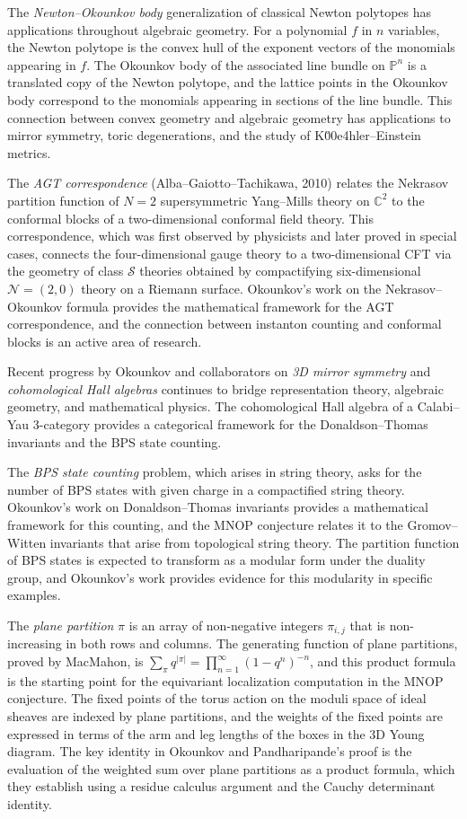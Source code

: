 The \emph{Newton--Okounkov body} generalization of classical Newton polytopes has applications throughout algebraic geometry. For a polynomial $f$ in $n$ variables, the Newton polytope is the convex hull of the exponent vectors of the monomials appearing in $f$. The Okounkov body of the associated line bundle on $\mathbb{P}^n$ is a translated copy of the Newton polytope, and the lattice points in the Okounkov body correspond to the monomials appearing in sections of the line bundle. This connection between convex geometry and algebraic geometry has applications to mirror symmetry, toric degenerations, and the study of K\u00e4hler--Einstein metrics.

The \emph{AGT correspondence} (Alba--Gaiotto--Tachikawa, 2010) relates the Nekrasov partition function of $N=2$ supersymmetric Yang--Mills theory on $\mathbb{C}^2$ to the conformal blocks of a two-dimensional conformal field theory. This correspondence, which was first observed by physicists and later proved in special cases, connects the four-dimensional gauge theory to a two-dimensional CFT via the geometry of class $\mathcal{S}$ theories obtained by compactifying six-dimensional $\mathcal{N}=(2,0)$ theory on a Riemann surface. Okounkov's work on the Nekrasov--Okounkov formula provides the mathematical framework for the AGT correspondence, and the connection between instanton counting and conformal blocks is an active area of research.

Recent progress by Okounkov and collaborators on \emph{3D mirror symmetry} and \emph{cohomological Hall algebras} continues to bridge representation theory, algebraic geometry, and mathematical physics. The cohomological Hall algebra of a Calabi--Yau 3-category provides a categorical framework for the Donaldson--Thomas invariants and the BPS state counting.

The \emph{BPS state counting} problem, which arises in string theory, asks for the number of BPS states with given charge in a compactified string theory. Okounkov's work on Donaldson--Thomas invariants provides a mathematical framework for this counting, and the MNOP conjecture relates it to the Gromov--Witten invariants that arise from topological string theory. The partition function of BPS states is expected to transform as a modular form under the duality group, and Okounkov's work provides evidence for this modularity in specific examples.

The \emph{plane partition} $\pi$ is an array of non-negative integers $\pi_{i,j}$ that is non-increasing in both rows and columns. The generating function of plane partitions, proved by MacMahon, is $\sum_\pi q^{|\pi|} = \prod_{n=1}^\infty (1-q^n)^{-n}$, and this product formula is the starting point for the equivariant localization computation in the MNOP conjecture. The fixed points of the torus action on the moduli space of ideal sheaves are indexed by plane partitions, and the weights of the fixed points are expressed in terms of the arm and leg lengths of the boxes in the 3D Young diagram. The key identity in Okounkov and Pandharipande's proof is the evaluation of the weighted sum over plane partitions as a product formula, which they establish using a residue calculus argument and the Cauchy determinant identity.

